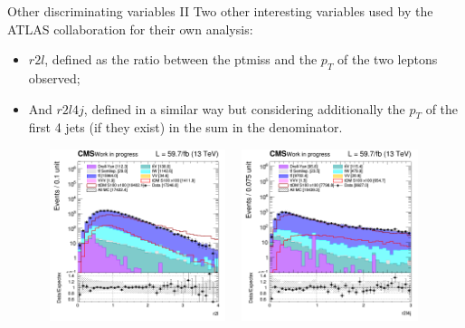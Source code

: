 \documentclass[8pt]{beamer}
\begin{document}
\begin{frame}{Other discriminating variables II}
\justifying
Two other interesting variables used by the ATLAS collaboration for their own analysis:
\vspace{-10pt}
\begin{itemize}
\justifying
\item $r2l$, defined as the ratio between the ptmiss and the $p_T$ of the two leptons observed; \item And $r2l4j$, defined in a similar way but considering additionally the $p_T$ of the first 4 jets (if they exist) in the sum in the denominator.
\end{itemize} \vfill

\begin{figure}[htbp]
\centering
\begin{minipage}[b]{.49\textwidth}
\includegraphics[width=5.5cm, height=5cm]{figs/2018/SmearSR-ttDM-scalar100/log_cratio_topCR_ll_r2l.png}
\end{minipage}\hfill
\begin{minipage}[b]{.49\textwidth}
\includegraphics[width=5.5cm, height=5cm]{figs/2018/SmearSR-ttDM-scalar100/log_cratio_topCR_ll_r2l4j.png}
\end{minipage} \hfill
\end{figure} \vfill
\end{frame}
\end{document}
